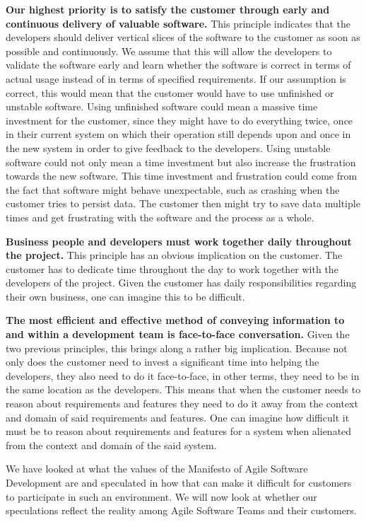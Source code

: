\textbf{Our highest priority is to satisfy the customer through early and continuous delivery of valuable software.} 
This principle indicates that the developers should deliver vertical slices of the software to the customer as soon as possible and continuously. 
We assume that this will allow the developers to validate the software early and learn whether the software is correct in terms of actual usage instead of in terms of specified requirements.
If our assumption is correct, this would mean that the customer would have to use unfinished or unstable software.
Using unfinished software could mean a massive time investment for the customer, since they might have to do everything twice, once in their current system on which their operation still depends upon and once in the new system in order to give feedback to the developers. 
Using unstable software could not only mean a time investment but also increase the frustration towards the new software.
This time investment and frustration could come from the fact that software might behave unexpectable, such as crashing when the customer tries to persist data. The customer then might try to save data multiple times and get frustrating with the software and the process as a whole.

\textbf{Business people and developers must work together daily throughout the project.}
This principle has an obvious implication on the customer. 
The customer has to dedicate time throughout the day to work together with the developers of the project. 
Given the customer has daily responsibilities regarding their own business, one can imagine this to be difficult.

\textbf{The most efficient and effective method of conveying information to and within a development team is face-to-face conversation.}
Given the two previous principles, this brings along a rather big implication.
Because not only does the customer need to invest a significant time into helping the developers, they also need to do it face-to-face, in other terms, they need to be in the same location as the developers. 
This means that when the customer needs to reason about requirements and features they need to do it away from the context and domain of said requirements and features. 
One can imagine how difficult it must be to reason about requirements and features for a system when alienated from the context and domain of the said system.

We have looked at what the values of the Manifesto of Agile Software Development are and speculated in how that can make it difficult for customers to participate in such an environment. We will now look at whether our speculations reflect the reality among Agile Software Teams and their customers.

